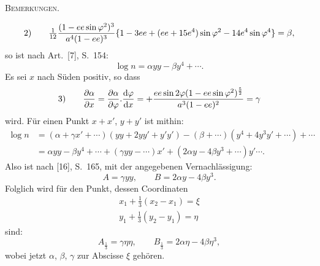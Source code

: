 \begingroup
\clearpage
{}\hfill\textsc{Bemerkungen.}\hfill\mbox{}\par\medskip
\begingroup\footnotesize
\[
\begin{array}{r@{\qquad}l}
2)&\displaystyle \tfrac1{12}\frac{(1-ee\sin\varphi^2)^3}{a^4(1-ee)^3}
\{1-3ee+(ee+15e^4)\sin\varphi^2-14e^4\sin\varphi^4\}=\beta,
\end{array}
\]
so ist nach Art.~[7], S.~154:
\[
\log n=\alpha yy-\beta y^4+\cdots.
\]
Es sei $x$ nach Süden positiv, so dass
\[
\begin{array}{r@{\qquad}l}
3)&\displaystyle\frac{\partial\alpha}{\partial x}
=\frac{\partial\alpha}{\partial\varphi}.\frac{\mathrm d\varphi}{\mathrm dx}
=+\frac{ee\sin2\varphi(1-ee\sin\varphi^2)^{\frac52}}{a^3(1-ee)^2}=\gamma
\end{array}
\]
wird. Für einen Punkt $x+x'$, $y+y'$ ist mithin:
\[
\begin{aligned}
\log n&=(\alpha+\gamma x'+\cdots)(yy+2yy'+y'y')-(\beta+\cdots)(y^4+4y^3y'+\cdots)+\cdots\\
&=\alpha yy-\beta y^4+\cdots+(\gamma yy-\cdots)x'+(2\alpha y-4\beta y^3+\cdots)y'\cdots.
\end{aligned}
\]
Also ist nach [16], S.~165, mit der angegebenen Vernachlässigung:
\[
A=\gamma yy,\qquad B=2\alpha y-4\beta y^3.
\]
Folglich wird für den Punkt, dessen Coordinaten
\[
\begin{gathered}
x_1+\tfrac13(x_2-x_1)=\xi\\
y_1+\tfrac13(y_2-y_1)=\eta
\end{gathered}
\]
sind:
\[
A_{\frac13}=\gamma\eta\eta,\qquad B_{\frac13}=2\alpha\eta-4\beta\eta^3,
\]
wobei jetzt $\alpha$, $\beta$, $\gamma$ zur Abscisse $\xi$ gehören.

